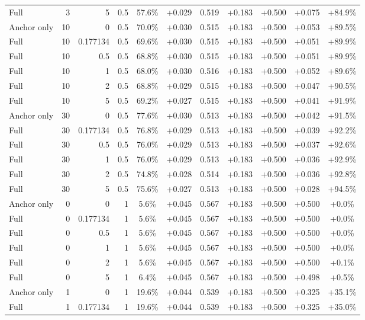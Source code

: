 \begin{table}[htbp]
\begin{tabular}{lrrrccccccc}
Full & 3 & 5 & 0.5 & 57.6\% & +0.029 & 0.519 & +0.183 & +0.500 & +0.075 & +84.9\% \\
Anchor only & 10 & 0 & 0.5 & 70.0\% & +0.030 & 0.515 & +0.183 & +0.500 & +0.053 & +89.5\% \\
Full & 10 & 0.177134 & 0.5 & 69.6\% & +0.030 & 0.515 & +0.183 & +0.500 & +0.051 & +89.9\% \\
Full & 10 & 0.5 & 0.5 & 68.8\% & +0.030 & 0.515 & +0.183 & +0.500 & +0.051 & +89.9\% \\
Full & 10 & 1 & 0.5 & 68.0\% & +0.030 & 0.516 & +0.183 & +0.500 & +0.052 & +89.6\% \\
Full & 10 & 2 & 0.5 & 68.8\% & +0.029 & 0.515 & +0.183 & +0.500 & +0.047 & +90.5\% \\
Full & 10 & 5 & 0.5 & 69.2\% & +0.027 & 0.515 & +0.183 & +0.500 & +0.041 & +91.9\% \\
Anchor only & 30 & 0 & 0.5 & 77.6\% & +0.030 & 0.513 & +0.183 & +0.500 & +0.042 & +91.5\% \\
Full & 30 & 0.177134 & 0.5 & 76.8\% & +0.029 & 0.513 & +0.183 & +0.500 & +0.039 & +92.2\% \\
Full & 30 & 0.5 & 0.5 & 76.0\% & +0.029 & 0.513 & +0.183 & +0.500 & +0.037 & +92.6\% \\
Full & 30 & 1 & 0.5 & 76.0\% & +0.029 & 0.513 & +0.183 & +0.500 & +0.036 & +92.9\% \\
Full & 30 & 2 & 0.5 & 74.8\% & +0.028 & 0.514 & +0.183 & +0.500 & +0.036 & +92.8\% \\
Full & 30 & 5 & 0.5 & 75.6\% & +0.027 & 0.513 & +0.183 & +0.500 & +0.028 & +94.5\% \\
Anchor only & 0 & 0 & 1 & 5.6\% & +0.045 & 0.567 & +0.183 & +0.500 & +0.500 & +0.0\% \\
Full & 0 & 0.177134 & 1 & 5.6\% & +0.045 & 0.567 & +0.183 & +0.500 & +0.500 & +0.0\% \\
Full & 0 & 0.5 & 1 & 5.6\% & +0.045 & 0.567 & +0.183 & +0.500 & +0.500 & +0.0\% \\
Full & 0 & 1 & 1 & 5.6\% & +0.045 & 0.567 & +0.183 & +0.500 & +0.500 & +0.0\% \\
Full & 0 & 2 & 1 & 5.6\% & +0.045 & 0.567 & +0.183 & +0.500 & +0.500 & +0.1\% \\
Full & 0 & 5 & 1 & 6.4\% & +0.045 & 0.567 & +0.183 & +0.500 & +0.498 & +0.5\% \\
Anchor only & 1 & 0 & 1 & 19.6\% & +0.044 & 0.539 & +0.183 & +0.500 & +0.325 & +35.1\% \\
Full & 1 & 0.177134 & 1 & 19.6\% & +0.044 & 0.539 & +0.183 & +0.500 & +0.325 & +35.0\% \\

\end{tabular}
\end{table}
